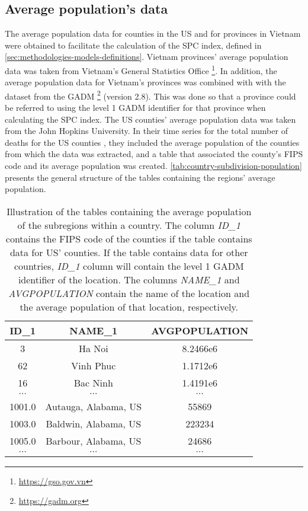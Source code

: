 \subsection{Average population's data}

The average population data for counties in the \gls{US} and for provinces in Vietnam were obtained to facilitate the calculation of the \gls{SPC} index, defined in \autoref{sec:methodologies-models-definitions}.
Vietnam provinces' average population data was taken from Vietnam's General Statistics Office \footnote{\url{https://gso.gov.vn}}.
In addition, the average population data for Vietnam's provinces was combined with with the dataset from the \gls{GADM} \footnote{\url{https://gadm.org}} (version 2.8).
This was done so that a province could be referred to using the level 1 \gls{GADM} identifier for that province when calculating the \gls{SPC} index.
The \gls{US} counties' average population data was taken from the John Hopkins University.
In their time series for the total number of deaths for the \gls{US} counties \cite{dongInteractiveWebbasedDashboard2020}, they included the average population of the counties from which the data was extracted, and a table that associated the county's \gls{FIPS} code and its average population was created.
\autoref{tab:country-subdivision-population} presents the general structure of the tables containing the regions' average population.

\begin{table}[h]
\centering
\begin{tabular}{| c | c | c |}
    ID\_1 & NAME\_1 & AVGPOPULATION \\
    \hline\hline
    3 & Ha Noi & 8.2466e6 \\
    \hline
    62 & Vinh Phuc & 1.1712e6 \\
    \hline
    16 & Bac Ninh & 1.4191e6 \\
    \hline
    $\cdots$ & $\cdots$ & $\cdots$ \\
    \hline
    1001.0 & Autauga, Alabama, US & 55869 \\
    \hline
    1003.0 & Baldwin, Alabama, US & 223234 \\
    \hline
    1005.0 & Barbour, Alabama, US & 24686 \\
    \hline
    $\cdots$ & $\cdots$ & $\cdots$ \\
\end{tabular}
\caption{Illustration of the tables containing the average population of the subregions within a country. The column \textit{ID\_1} contains the FIPS code of the counties if the table contains data for US' counties. If the table contains data for other countries, \textit{ID\_1} column will contain the level 1 GADM identifier of the location. The columns \textit{NAME\_1} and \textit{AVGPOPULATION} contain the name of the location and the average population of that location, respectively.}
\label{tab:country-subdivision-population}
\end{table}